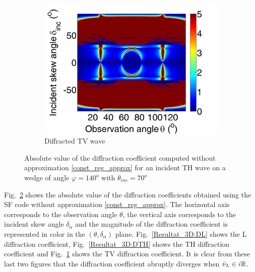 \begin{figure}
\begin{subfigure}[b]{0.32\textwidth}
        \includegraphics[width=\textwidth]{images/chapter4/Resultats_3D/XpropTV_140_70_TH.png}
        \caption{Diffracted TV wave}
        \label{Resultat_3D:DTV}
    \end{subfigure} 
\caption{Absolute value of the diffraction coefficient computed without approximation \eqref{const_reg_approx} for an incident TH wave on a wedge of angle $\varphi=140^o$ with $\theta_{inc}=70^o$}
\label{Resultat_3D:D}
\end{figure}

Fig.~\ref{Resultat_3D:D} shows the absolute value of the diffraction coefficients obtained using the SF code without approximation \eqref{const_reg_approx}. The horizontal axis corresponds to the observation angle $\theta$, the vertical axis corresponds to the incident skew angle $\delta_{\alpha}$ and the magnitude of the diffraction coefficient is represented in color in the $(\theta,\delta_{\alpha})$ plane. Fig.~\ref{Resultat_3D:DL} shows the L diffraction coefficient, Fig.~\ref{Resultat_3D:DTH} shows the TH diffraction coefficient and Fig.~\ref{Resultat_3D:DTV} shows the TV diffraction coefficient. It is clear from these last two figures that the diffraction coefficient abruptly diverges when $\tilde{\nu}_L \in i\mathbb{R}$.


